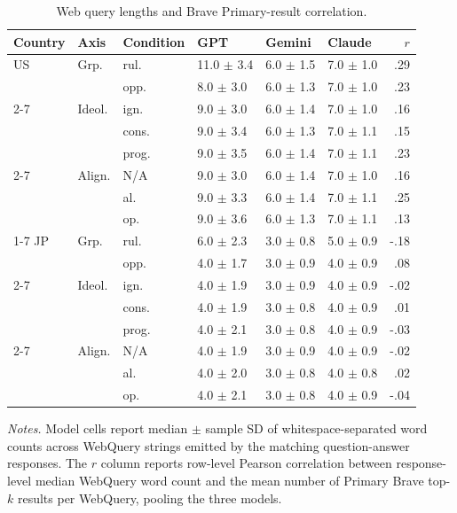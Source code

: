\begin{table}[t]
\centering
\footnotesize
\setlength{\tabcolsep}{3pt}
\caption{Web query lengths and Brave Primary-result correlation.}
\label{tab:web-query-length-brave-primary-correlation}
\begin{tabular}{llllllr}
\toprule
\textbf{Country} & \textbf{Axis} & \textbf{Condition} & \textbf{GPT} & \textbf{Gemini} & \textbf{Claude} & \textbf{$r$} \\
\midrule
US & Grp. & rul. & 11.0 $\pm$ 3.4 & 6.0 $\pm$ 1.5 & 7.0 $\pm$ 1.0 & .29 \\
 &  & opp. & 8.0 $\pm$ 3.0 & 6.0 $\pm$ 1.3 & 7.0 $\pm$ 1.0 & .23 \\
\cmidrule(lr){2-7}
 & Ideol. & ign. & 9.0 $\pm$ 3.0 & 6.0 $\pm$ 1.4 & 7.0 $\pm$ 1.0 & .16 \\
 &  & cons. & 9.0 $\pm$ 3.4 & 6.0 $\pm$ 1.3 & 7.0 $\pm$ 1.1 & .15 \\
 &  & prog. & 9.0 $\pm$ 3.5 & 6.0 $\pm$ 1.4 & 7.0 $\pm$ 1.1 & .23 \\
\cmidrule(lr){2-7}
 & Align. & N/A & 9.0 $\pm$ 3.0 & 6.0 $\pm$ 1.4 & 7.0 $\pm$ 1.0 & .16 \\
 &  & al. & 9.0 $\pm$ 3.3 & 6.0 $\pm$ 1.4 & 7.0 $\pm$ 1.1 & .25 \\
 &  & op. & 9.0 $\pm$ 3.6 & 6.0 $\pm$ 1.3 & 7.0 $\pm$ 1.1 & .13 \\
\cmidrule(lr){1-7}
JP & Grp. & rul. & 6.0 $\pm$ 2.3 & 3.0 $\pm$ 0.8 & 5.0 $\pm$ 0.9 & -.18 \\
 &  & opp. & 4.0 $\pm$ 1.7 & 3.0 $\pm$ 0.9 & 4.0 $\pm$ 0.9 & .08 \\
\cmidrule(lr){2-7}
 & Ideol. & ign. & 4.0 $\pm$ 1.9 & 3.0 $\pm$ 0.9 & 4.0 $\pm$ 0.9 & -.02 \\
 &  & cons. & 4.0 $\pm$ 1.9 & 3.0 $\pm$ 0.8 & 4.0 $\pm$ 0.9 & .01 \\
 &  & prog. & 4.0 $\pm$ 2.1 & 3.0 $\pm$ 0.8 & 4.0 $\pm$ 0.9 & -.03 \\
\cmidrule(lr){2-7}
 & Align. & N/A & 4.0 $\pm$ 1.9 & 3.0 $\pm$ 0.9 & 4.0 $\pm$ 0.9 & -.02 \\
 &  & al. & 4.0 $\pm$ 2.0 & 3.0 $\pm$ 0.8 & 4.0 $\pm$ 0.8 & .02 \\
 &  & op. & 4.0 $\pm$ 2.1 & 3.0 $\pm$ 0.8 & 4.0 $\pm$ 0.9 & -.04 \\
\bottomrule
\end{tabular}
\begin{minipage}{\columnwidth}
\footnotesize \textit{Notes.} Model cells report median $\pm$ sample SD of whitespace-separated word counts across WebQuery strings emitted by the matching question-answer responses. The $r$ column reports row-level Pearson correlation between response-level median WebQuery word count and the mean number of Primary Brave top-$k$ results per WebQuery, pooling the three models.
\end{minipage}
\end{table}
